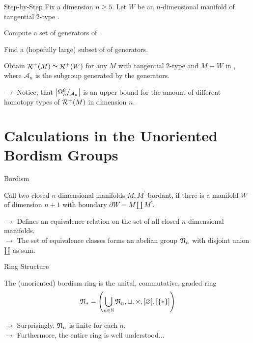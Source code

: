 \documentclass{presis}
\begin{document}
\begin{frame}{Step-by-Step}
    Fix a dimension $n\geq 5$. Let $W$ be an $n$-dimensional manifold of tangential $2$-type .
    \begin{vfilleditems}
    \item[\protect\circled{1}] Compute a set of generators of .\pause
    \item[\protect\circled{2}] Find a (hopefully large) subset of of \good{} generators.\pause
    \item[\protect\circled{3}] Obtain $\mathcal{R}^+(M) \simeq \mathcal{R}^+(W)$ for any $M$ with tangential $2$-type  and $M \equiv W$ in , where $\mathcal{A}_n$ is the subgroup generated by the \good{} generators.\pause
    \end{vfilleditems}
    $\rightarrow$ Notice, that $\left\lvert\Omega_n^\theta/_{\mathcal{A}_n}\right\rvert$ is an upper bound for the amount of different homotopy types of $\mathcal{R}^+(M)$ in dimension $n$.
\end{frame}

\section{Calculations in the Unoriented Bordism Groups}

\begin{frame}{Bordism}
    \begin{defi}
        Call two closed $n$-dimensional manifolds $M,M^\prime$ bordant, if there is a manifold $W$ of dimension $n+1$ with boundary $\partial W = M \amalg M^\prime$.
    \end{defi}\pause
    $\rightarrow$ Defines an equivalence relation on the set of all closed $n$-dimensional manifolds.\pause \\
    $\rightarrow$ The set of equivalence classes forms an abelian group $\mathfrak{N}_n$ with disjoint union $\amalg$ as sum.
\end{frame}

\begin{frame}{Ring Structure}
    \begin{defi}
        The (unoriented) bordism ring is the unital, commutative, graded ring
        \begin{equation*}
            \mathfrak{N}_\ast = \left(\bigcup\limits_{n\in\mathbb{N}} \mathfrak{N}_n, \sqcup, \times, [\varnothing], [\{\ast\}]\right)
        \end{equation*}
    \end{defi}\pause
    $\rightarrow$ Surprisingly, $\mathfrak{N}_n$ is finite for each $n$.\pause \\
    $\rightarrow$ Furthermore, the entire ring is well understood...
\end{frame}
\end{document}
